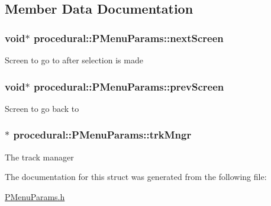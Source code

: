 \subsection{Member Data Documentation}
\hypertarget{structprocedural_1_1_p_menu_params_a04e86634b8236fdc94d8c68607e582d1}{
\subsubsection[{next\-Screen}]{\setlength{\rightskip}{0pt plus 5cm}void$\ast$ procedural\-::\-P\-Menu\-Params\-::next\-Screen}}\label{structprocedural_1_1_p_menu_params_a04e86634b8236fdc94d8c68607e582d1}
Screen to go to after selection is made \hypertarget{structprocedural_1_1_p_menu_params_ae1078aa601864c8327fe2935f649269c}{
\subsubsection[{prev\-Screen}]{\setlength{\rightskip}{0pt plus 5cm}void$\ast$ procedural\-::\-P\-Menu\-Params\-::prev\-Screen}}\label{structprocedural_1_1_p_menu_params_ae1078aa601864c8327fe2935f649269c}
Screen to go back to \hypertarget{structprocedural_1_1_p_menu_params_ad7cf8a5c5194d7a73e957bbd5d309d18}{
\subsubsection[{trk\-Mngr}]{$\ast$ procedural\-::\-P\-Menu\-Params\-::trk\-Mngr}}\label{structprocedural_1_1_p_menu_params_ad7cf8a5c5194d7a73e957bbd5d309d18}
The track manager 

The documentation for this struct was generated from the following file\-:\begin{DoxyCompactItemize}
\item 
\hyperlink{_p_menu_params_8h}{P\-Menu\-Params.\-h}\end{DoxyCompactItemize}
